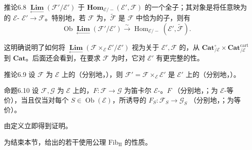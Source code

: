 \begin{SGAresult}{推论}{6.8}
$\mathop{\mathbf{Lim}}\limits_{\longleftarrow}(\mathcal F'/\mathcal E')$ 于 $\mathbf{Hom}_{\mathcal E/-}(\mathcal E',\mathcal F)$ 的一个全子；其对象是将任意映为的 $\mathcal E$- $\mathcal E'\to\mathcal F$。特别地，若 $\mathcal F$ 为，$\widetilde{\mathcal F}$ 是 $\mathcal F$ 中恰为的子，则有
\[
 \operatorname{Ob}\mathop{\mathbf{Lim}}\limits_{\longleftarrow}(\mathcal F'/\mathcal E')
 \xrightarrow{\sim}\operatorname{Hom}_{\mathcal E/-}(\mathcal E',\widetilde{\mathcal F}).
\]
\end{SGAresult}
这明确说明了如何将 $\mathop{\mathbf{Lim}}\limits_{\longleftarrow}(\mathcal F\times_{\mathcal E}\mathcal E'/\mathcal E')$ 视为关于 $\mathcal E',\mathcal F$ 的，从 $\mathbf{Cat}_{/\mathcal E}^{\circ}\times\mathbf{Cat}^{\mathrm{cart}}_{/\mathcal E}$ 到 $\mathbf{Cat}$。后面还会看到，在要求 $\mathcal F$ 为时，它对 $\mathcal E'$ 有更完整的性。

\begin{SGAresult}{推论}{6.9}
设 $\mathcal F$ 为 $\mathcal E$ 上的（分别地，），则 $\mathcal F'=\mathcal F\times_{\mathcal E}\mathcal E'$ 是 $\mathcal E'$ 上的（分别地，）。
\end{SGAresult}

\begin{SGAresult}{命题}{6.10}
设 $\mathcal F,\mathcal G$ 为 $\mathcal E$ 上的，$F:\mathcal F\to\mathcal G$ 为笛卡尔 $\mathcal E$-。$F$ （分别地，；为 $\mathcal E$-等价），当且仅当对每个 $S\in\operatorname{Ob}(\mathcal E)$，所诱导的 $F_S:\mathcal F_S\to\mathcal G_S$ （分别地，；为等价）。
\end{SGAresult}
由定义立即得到证明。

为结束本节，给出的若干使用公理 $\mathrm{Fib}_{\mathrm{II}}$ 的性质。

